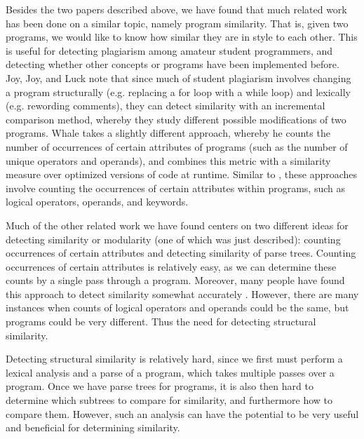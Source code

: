 \documentclass{article}
\begin{document}
Besides the two papers described above, we have found that much related work has been done on a similar topic, namely
 program similarity. That is, given two programs, we would like to know how similar they are in style to each other.
This is useful for detecting plagiarism among amateur student programmers, and detecting whether other concepts or programs
have been implemented before. Joy, Joy, and Luck \cite{PlagiarismProgrammingAssignments} note that since much of student plagiarism involves changing a program structurally (e.g. replacing a for loop with a while loop) and lexically (e.g. rewording comments), they can
detect similarity with an incremental comparison method, whereby they study different possible modifications of two programs.
Whale \cite{ProgramSimilarityPopulations} takes a slightly different approach, whereby he counts the number of occurrences of certain attributes of programs (such as the number of unique operators and operands), and combines this metric with a similarity measure over optimized versions of code at runtime. Similar to \cite{Modularity1979}, these approaches involve counting the occurrences of certain attributes within programs, such as logical operators, operands, and keywords.

Much of the other related work\cite{McGahn1995,GraphSimilarityStudentPrograms} we have found centers on two different ideas for detecting similarity or modularity
(one of which was just described): counting occurrences
of certain attributes and detecting similarity of parse trees. Counting occurrences of certain attributes is relatively easy, as we can
determine these counts by a single pass through a program. Moreover, many people have found this approach to detect similarity 
somewhat accurately \cite{Modularity1979}\cite{PlagiarismProgrammingAssignments}. However, there are many instances when counts of
logical operators and operands could be the same, but programs could be very different. Thus the need for detecting structural similarity.

Detecting structural similarity is relatively hard, since we first must perform a lexical analysis and a parse of a program, which takes
multiple passes over a program. Once we have parse trees for programs, it is also then hard to determine which subtrees to compare for
similarity, and furthermore how to compare them. However, such an analysis can have the potential to be very useful and beneficial
for determining similarity\cite{ProgramSimilarityPopulations}\cite{PlagiarismProgrammingAssignments}.
\end{document}

